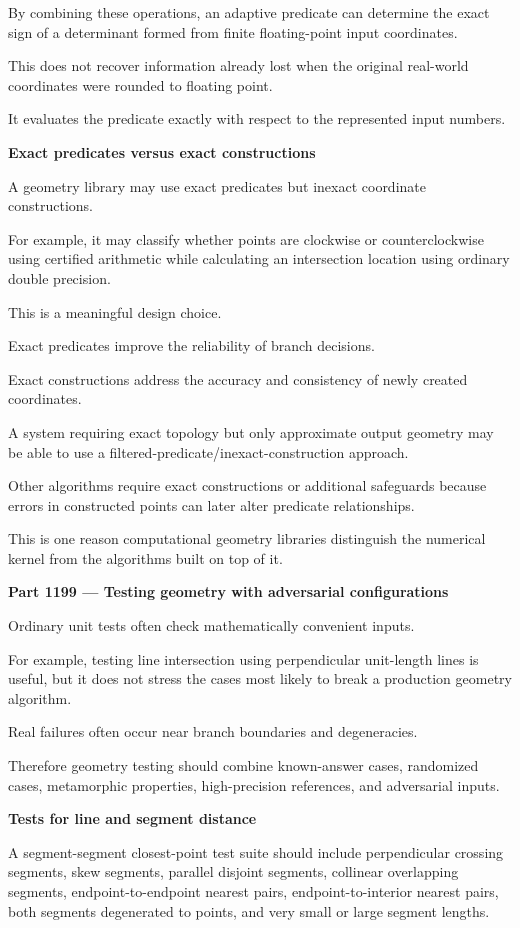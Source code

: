 By combining these operations, an adaptive predicate can determine the exact sign of a determinant formed from finite floating-point input coordinates.

This does not recover information already lost when the original real-world coordinates were rounded to floating point.

It evaluates the predicate exactly with respect to the represented input numbers.

\textbf{Exact predicates versus exact constructions}

A geometry library may use exact predicates but inexact coordinate constructions.

For example, it may classify whether points are clockwise or counterclockwise using certified arithmetic while calculating an intersection location using ordinary double precision.

This is a meaningful design choice.

Exact predicates improve the reliability of branch decisions.

Exact constructions address the accuracy and consistency of newly created coordinates.

A system requiring exact topology but only approximate output geometry may be able to use a filtered-predicate/inexact-construction approach.

Other algorithms require exact constructions or additional safeguards because errors in constructed points can later alter predicate relationships.

This is one reason computational geometry libraries distinguish the numerical kernel from the algorithms built on top of it.

\textbf{Part 1199 --- Testing geometry with adversarial configurations}

Ordinary unit tests often check mathematically convenient inputs.

For example, testing line intersection using perpendicular unit-length lines is useful, but it does not stress the cases most likely to break a production geometry algorithm.

Real failures often occur near branch boundaries and degeneracies.

Therefore geometry testing should combine known-answer cases, randomized cases, metamorphic properties, high-precision references, and adversarial inputs.

\textbf{Tests for line and segment distance}

A segment-segment closest-point test suite should include perpendicular crossing segments, skew segments, parallel disjoint segments, collinear overlapping segments, endpoint-to-endpoint nearest pairs, endpoint-to-interior nearest pairs, both segments degenerated to points, and very small or large segment lengths.


